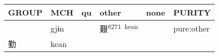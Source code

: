\documentclass[14pt,a4paper]{scrartcl}
\begin{document}
\begin{longtable}[c]{@{}llllll@{}}
\toprule
\begin{minipage}[b]{0.14\columnwidth}\raggedright\strut
GROUP
\strut\end{minipage} &
\begin{minipage}[b]{0.14\columnwidth}\raggedright\strut
MCH
\strut\end{minipage} &
\begin{minipage}[b]{0.14\columnwidth}\raggedright\strut
qu
\strut\end{minipage} &
\begin{minipage}[b]{0.14\columnwidth}\raggedright\strut
other
\strut\end{minipage} &
\begin{minipage}[b]{0.14\columnwidth}\raggedright\strut
none
\strut\end{minipage} &
\begin{minipage}[b]{0.14\columnwidth}\raggedright\strut
PURITY
\strut\end{minipage}\tabularnewline
\midrule
\endhead
\begin{minipage}[t]{0.14\columnwidth}\raggedright\strut
𡎸
\strut\end{minipage} &
\begin{minipage}[t]{0.14\columnwidth}\raggedright\strut
gjɨn
\strut\end{minipage} &
\begin{minipage}[t]{0.14\columnwidth}\raggedright\strut
\strut\end{minipage} &
\begin{minipage}[t]{0.14\columnwidth}\raggedright\strut
艱\textsuperscript{8271~kean}
\strut\end{minipage} &
\begin{minipage}[t]{0.14\columnwidth}\raggedright\strut
\strut\end{minipage} &
\begin{minipage}[t]{0.14\columnwidth}\raggedright\strut
pure:other
\strut\end{minipage}\tabularnewline
\begin{minipage}[t]{0.14\columnwidth}\raggedright\strut
勤
\strut\end{minipage} &
\begin{minipage}[t]{0.14\columnwidth}\raggedright\strut
kean
\strut\end{minipage} &
\begin{minipage}[t]{0.14\columnwidth}\raggedright\strut
\strut\end{minipage} &

\end{longtable}
\end{document}
